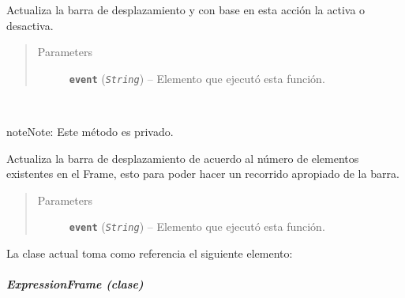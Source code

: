 \documentclass[letterpaper,10pt,english]{sphinxmanual}
\begin{document}
\begin{fulllineitems}
\begin{fulllineitems}
Actualiza la barra de desplazamiento y con base en esta acción
la activa o desactiva.
\begin{quote}\begin{description}
\item[{Parameters}] \leavevmode
\textbf{\texttt{event}} (\emph{\texttt{String}}) -- Elemento que ejecutó esta función.

\end{description}\end{quote}

\end{fulllineitems}


\begin{fulllineitems}
\label{View/Additional/MenuInternalOption/InternalOptionTab/PythonExpressionFrame:View.Additional.MenuInternalOption.InternalOptionTab.PythonExpressionFrame.PythonExpressionFrame._PythonExpressionFrame__update_scrollbar}~
\begin{notice}{note}{Note:}
Este método es privado.
\end{notice}

Actualiza la barra de desplazamiento de acuerdo al número de elementos
existentes en el Frame, esto para poder hacer un recorrido apropiado de 
la barra.
\begin{quote}\begin{description}
\item[{Parameters}] \leavevmode
\textbf{\texttt{event}} (\emph{\texttt{String}}) -- Elemento que ejecutó esta función.

\end{description}\end{quote}

\end{fulllineitems}


\end{fulllineitems}


La clase actual toma como referencia el siguiente elemento:


\subparagraph{ExpressionFrame (clase)}
\label{View/Additional/MenuInternalOption/InternalOptionTab/ExpressionFrame::doc}\label{View/Additional/MenuInternalOption/InternalOptionTab/ExpressionFrame:module-View.Additional.MenuInternalOption.InternalOptionTab.ExpressionFrame}\label{View/Additional/MenuInternalOption/InternalOptionTab/ExpressionFrame:expressionframe-clase}
\end{document}
